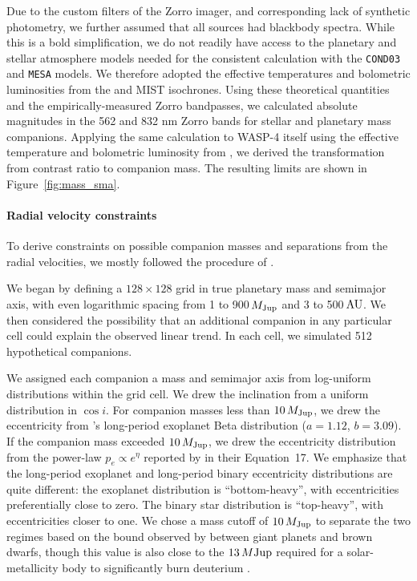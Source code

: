 \documentclass[12pt,twocolumn,tighten]{aastex62}
\begin{document}
Due to the custom filters of the Zorro imager, and corresponding lack
of synthetic photometry, we further assumed that all sources had
blackbody spectra. While this is a bold simplification, we do not readily have
access to the planetary and stellar atmosphere models needed for the
consistent calculation with the \texttt{COND03} and \texttt{MESA}
models.  We therefore adopted the effective temperatures and
bolometric luminosities from the \citet{baraffe_evolutionary_2003} and
MIST isochrones.  Using these theoretical quantities and the
empirically-measured Zorro bandpasses, we calculated absolute
magnitudes in the 562 and 832 nm Zorro bands for stellar and planetary
mass companions.  Applying the same calculation to WASP-4 itself using
the effective temperature and bolometric luminosity from
, we derived the transformation from
contrast ratio to companion mass.  The resulting limits are shown in
Figure~\ref{fig:mass_sma}.


\paragraph{Radial velocity constraints}

To derive constraints on possible companion masses and separations
from the radial velocities, we mostly followed the procedure of
\citet{bryan_excess_2019}. 

We began by defining a $128\times128$ grid in true planetary mass and
semimajor axis, with even logarithmic spacing from 1 to 900$\,$$M_{\rm
Jup}$ and 3 to 500$\,$${\rm AU}$.  We then considered the possibility
that an additional companion in any particular cell could explain the
observed linear trend.  In each cell, we simulated 512 hypothetical
companions.

We assigned each companion a mass and semimajor axis from log-uniform
distributions within the grid cell. We drew the inclination from a
uniform distribution in $\cos i$.  For companion masses less than
$10\,M_{\rm Jup}$, we drew the eccentricity from
\citet{kipping_beta_2013}'s long-period exoplanet Beta distribution
($a=1.12$, $b=3.09$).  If the companion mass exceeded $10\,M_{\rm
Jup}$, we drew the eccentricity distribution from the power-law $p_e
\propto e^\eta$ reported by \citet{moe_mind_2017} in their
Equation~17.  We emphasize that the long-period exoplanet and
long-period binary eccentricity distributions are quite different: the
exoplanet distribution is ``bottom-heavy'', with eccentricities
preferentially close to zero. The binary star distribution is
``top-heavy'', with eccentricities closer to one.  We chose a mass
cutoff of $10\,M_{\rm Jup}$ to separate the two regimes based on the
bound observed by \citet{schlaufman_evidence_2018} between
giant planets and brown dwarfs, though this value is also close to the
$13\,M{\rm Jup}$ required for a solar-metallicity body to
significantly burn deuterium \citep{burrows_nongray_1997}.
\end{document}
